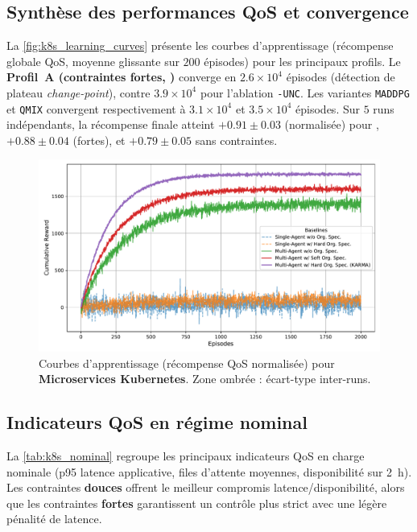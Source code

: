 \subsection*{Synthèse des performances QoS et convergence}

La \autoref{fig:k8s_learning_curves} présente les courbes d’apprentissage (récompense globale QoS, moyenne glissante sur $200$ épisodes) pour les principaux profils.
Le \textbf{Profil~A (contraintes fortes, )} converge en $2.6\times 10^4$ épisodes (détection de plateau \emph{change-point}), contre $3.9\times 10^4$ pour l’ablation \texttt{-UNC}.
Les variantes \texttt{MADDPG} et \texttt{QMIX} convergent respectivement à $3.1\times 10^4$ et $3.5\times 10^4$ épisodes.
Sur $5$ runs indépendants, la récompense finale atteint $+0.91 \pm 0.03$ (normalisée) pour , $+0.88 \pm 0.04$ (fortes), et $+0.79 \pm 0.05$ sans contraintes.

\begin{figure}[h!]
  \centering
  \includegraphics[width=0.75\linewidth]{figures/results_k8s_learning.pdf}
  \caption{Courbes d’apprentissage (récompense QoS normalisée) pour \textbf{Microservices Kubernetes}. Zone ombrée : écart-type inter-runs.}
  \label{fig:k8s_learning_curves}
\end{figure}

\subsection*{Indicateurs QoS en régime nominal}

La \autoref{tab:k8s_nominal} regroupe les principaux indicateurs QoS en charge nominale (p95 latence applicative, files d’attente moyennes, disponibilité sur 2~h).
Les contraintes \textbf{douces} offrent le meilleur compromis latence/disponibilité, alors que les contraintes \textbf{fortes} garantissent un contrôle plus strict avec une légère pénalité de latence.


